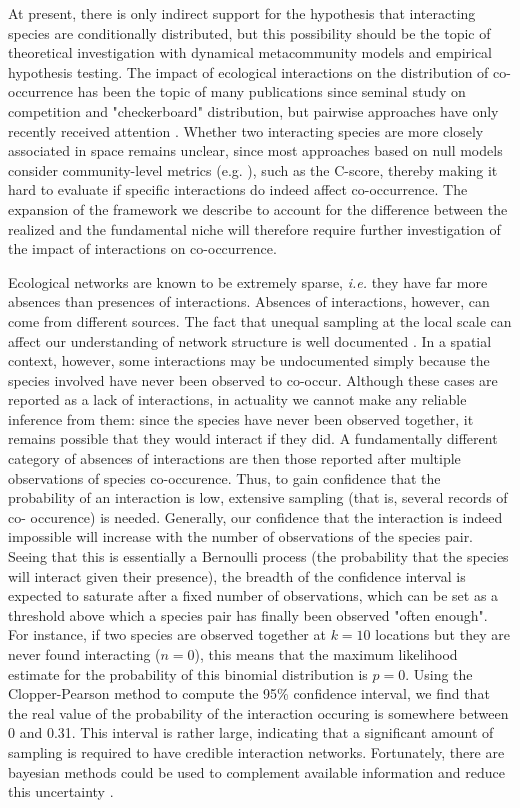 \documentclass[12pt]{article}
\begin{document}
At present, there is only indirect support for the hypothesis that interacting
species are conditionally distributed, but this possibility should be the
topic of theoretical investigation with dynamical metacommunity models
\citep{Cazelles2015} and empirical hypothesis testing. The impact of
ecological interactions on the distribution of co-occurrence has been the
topic of many publications since \citet{Diamond1975} seminal study on
competition and "checkerboard" distribution, but pairwise approaches have only
recently received attention \citep{Veech2013}. Whether two interacting species
are more closely associated in space remains unclear, since most approaches
based on null models consider community-level metrics (e.g.
\citealt{Gotelli2000}), such as the C-score, thereby making it hard to
evaluate if specific interactions do indeed affect co-occurrence. The
expansion of the framework we describe to account for the difference between
the realized and the fundamental niche will therefore require further
investigation of the impact of interactions on co-occurrence.

Ecological networks are known to be extremely sparse, \emph{i.e.} they have
far more absences than presences of interactions. Absences of interactions,
however, can come from different sources. The fact that unequal sampling at
the local scale can affect our understanding of network structure is well
documented \citep{Martinez1999}. In a spatial context, however, some
interactions may be undocumented simply because the species involved have
never been observed to co-occur. Although these cases are reported as a lack
of interactions, in actuality we cannot make any reliable inference from them:
since the species have never been observed together, it remains possible that
they would interact if they did. A fundamentally different category of
absences of interactions are then those reported after multiple observations
of species co-occurence. Thus, to gain confidence that the probability of an
interaction is low, extensive sampling (that is, several records of co-
occurence) is needed. Generally, our confidence that the interaction is indeed
impossible will increase with the number of observations of the species pair.
Seeing that this is essentially a Bernoulli process (the probability that the
species will interact given their presence), the breadth of the confidence
interval is expected to saturate after a fixed number of observations, which
can be set as a threshold above which a species pair has finally been observed
"often enough". For instance, if two species are observed together at $k=10$
locations but they are never found interacting ($n=0$), this means that the
maximum likelihood estimate for the probability of this binomial distribution
is $p=0$. Using the Clopper-Pearson method to compute the 95\% confidence
interval, we find that the real value of the probability of the interaction
occuring is somewhere between 0 and 0.31. This interval is rather large,
indicating that a significant amount of sampling is required to have credible
interaction networks. Fortunately, there are bayesian methods could be used to
complement available information and reduce this uncertainty
\citep{Cirtwill2018}.
\end{document}
